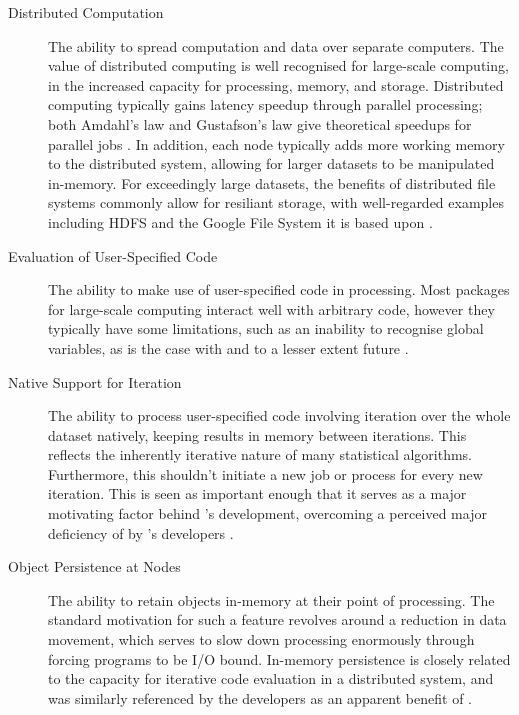 \begin{description}
  \item[Distributed Computation]
    The ability to spread computation and data over separate computers. The
    value of distributed computing is well recognised for large-scale
    computing, in the increased capacity for processing, memory, and
    storage. Distributed computing typically gains latency speedup through
    parallel processing; both Amdahl's law and Gustafson's law give
    theoretical speedups for parallel jobs \cites{amdahl1967law,gustafson1988law}. In addition, each node typically adds more working
    memory to the distributed system, allowing for larger datasets to be
    manipulated in-memory. For exceedingly large datasets, the benefits of
    distributed file systems commonly allow for resiliant storage, with
    well-regarded examples including HDFS and the Google File System it is
    based upon \cites{shvachko2010hadoop,ghemawat2003google}.
  \item[Evaluation of User-Specified Code]
    The ability to make use of user-specified code in processing. Most \R
    packages for large-scale computing interact well with arbitrary code,
    however they typically have some limitations, such as an inability to
    recognise global variables, as is the case with  and to a lesser
    extent future \cites{sparklyr2020limitations,microsoft20}.
  \item[Native Support for Iteration]
    The ability to process user-specified code involving iteration over the
    whole dataset natively, keeping results in memory between iterations.
    This reflects the inherently iterative nature of many statistical
    algorithms. Furthermore, this shouldn't initiate a new job or process
    for every new iteration. This is seen as important enough that it serves
    as a major motivating factor behind 's development, overcoming a
    perceived major deficiency of  by 's developers
    \cite{zaharia2010spark}.
  \item[Object Persistence at Nodes]
    The ability to retain objects in-memory at their point of processing.
    The standard motivation for such a feature revolves around a reduction
    in data movement, which serves to slow down processing enormously
    through forcing programs to be I/O bound. In-memory persistence is
    closely related to the capacity for iterative code evaluation in a
    distributed system, and was similarly referenced by the  developers
    as an apparent benefit of \cite{zaharia2010spark}.

\end{description}
